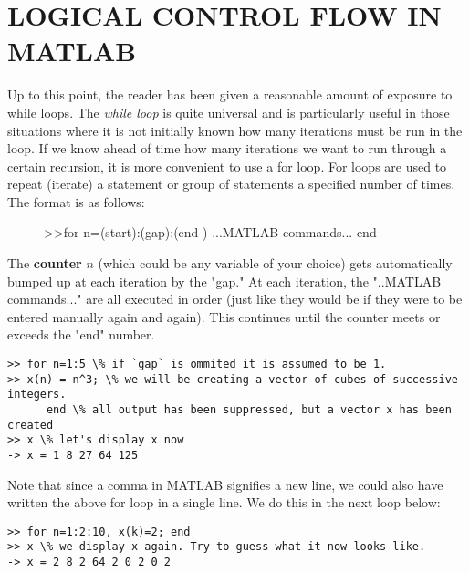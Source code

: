 \documentclass[../main.tex]{subfiles}
\begin{document}
\section{LOGICAL CONTROL FLOW IN MATLAB}

Up to this point, the reader has been given a reasonable amount of exposure to while loops. The \emph{while loop} is quite universal and is particularly useful in those situations where it is not initially known how many iterations must be run in the loop. If we know ahead of time how many iterations we want to run through a certain recursion, it is more convenient to use a for loop. For loops are used to repeat (iterate) a statement or group of statements a specified number of times. The format is as follows:\\

\begin{figure}[H]
\centering
\begin{boxedverbatim}
>>for n=(start):(gap):(end )
	...MATLAB commands...
end
\end{boxedverbatim}
\end{figure}

The \textbf{counter} $n$ (which could be any variable of your choice) gets automatically bumped up at each iteration by the "gap." At each iteration, the "..MATLAB commands..." are all executed in order (just like they would be if they were to be entered manually again and again). This continues until the counter meets or exceeds the "end" number.

\begin{verbatim}
>> for n=1:5 \% if `gap` is ommited it is assumed to be 1. 
>> x(n) = n^3; \% we will be creating a vector of cubes of successive integers.
      end \% all output has been suppressed, but a vector x has been created
>> x \% let's display x now
-> x = 1 8 27 64 125
\end{verbatim}

Note that since a comma in MATLAB signifies a new line, we could also have
written the above for loop in a single line. We do this in the next loop below: \\

\begin{verbatim}
>> for n=1:2:10, x(k)=2; end
>> x \% we display x again. Try to guess what it now looks like.
-> x = 2 8 2 64 2 0 2 0 2 
\end{verbatim}
\end{document}
